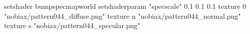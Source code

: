 setshader bumpspecmapworld
setshaderparam "specscale" 0.1 0.1 0.1
   texture 0 "nobiax/pattern044_diffuse.png"
   texture n "nobiax/pattern044_normal.png"
   texture s "nobiax/pattern044_specular.png"